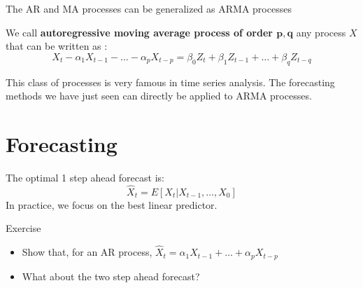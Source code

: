 \documentclass{beamer}
\begin{document}
\begin{frame}{}
The AR and MA processes can be generalized as ARMA processes
\begin{definition}
We call \textbf{autoregressive moving average process of order $\mathbf{p},\mathbf{q}$} any process $X$ that can be written as :
\begin{equation*}
X_t - \alpha_1 X_{t-1} - \dots - \alpha_p X_{t-p}  = \beta_0 Z_{t} + \beta_1 Z_{t-1} + \dots + \beta_q Z_{t-q}
\end{equation*}
\end{definition}
This class of processes is very famous in time series analysis. The forecasting methods we have just seen can directly be applied to ARMA processes.
\end{frame}


\section{Forecasting}

\begin{frame}{}
The optimal 1 step ahead forecast is:
\begin{equation*}
\hat{X}_t = E[X_{t}|X_{t-1},\dots,X_0]
\end{equation*}
In practice, we focus on the best linear predictor.
\begin{exampleblock}{Exercise}
\begin{itemize}
	\item Show that, for an AR process, $\hat{X}_t = \alpha_1 X_{t-1} + \dots + \alpha_p X_{t-p}$
	\item What about the two step ahead forecast?
\end{itemize}
\end{exampleblock}

\end{frame}
\end{document}

